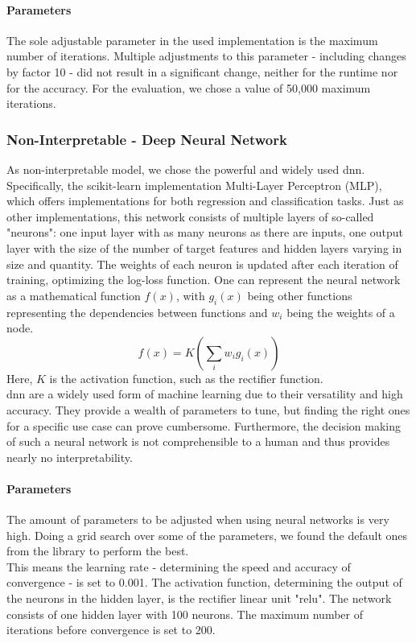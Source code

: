 \documentclass[conference,comsoc]{IEEEtran}
\begin{document}
\paragraph{Parameters}
The sole adjustable parameter in the used implementation is the maximum number of iterations. 
Multiple adjustments to this parameter - including changes by factor 10 - did not result in a significant change, neither for the runtime nor for the accuracy. 
For the evaluation, we chose a value of 50,000 maximum iterations.

\subsubsection{Non-Interpretable - Deep Neural Network}
As non-interpretable model, we chose the powerful and widely used \gls{dnn}. 
Specifically, the scikit-learn implementation Multi-Layer Perceptron (MLP), which offers implementations for both regression and classification tasks.
Just as other implementations, this network consists of multiple layers of so-called "neurons": one input layer with as many neurons as there are inputs, one output layer with the size of the number of target features and hidden layers varying in size and quantity. 
The weights of each neuron is updated after each iteration of training, optimizing the log-loss function. 
One can represent the neural network as a mathematical function $f(x)$, with $g_i (x)$ being other functions representing the dependencies between functions and $w_i$ being the weights of a node. 
\begin{equation}
f(x) = K(\sum _i w_i g_i (x))
\end{equation}
Here, $K$ is the activation function, such as the rectifier function. \\
\gls{dnn} are a widely used form of machine learning due to their versatility and high accuracy.
They provide a wealth of parameters to tune, but finding the right ones for a specific use case can prove cumbersome.
Furthermore, the decision making of such a neural network is not comprehensible to a human and thus provides nearly no interpretability.
\paragraph{Parameters}
The amount of parameters to be adjusted when using neural networks is very high.
Doing a grid search over some of the parameters, we found the default ones from the library to perform the best.\\
This means the learning rate - determining the speed and accuracy of convergence - is set to 0.001. 
The activation function, determining the output of the neurons in the hidden layer, is the rectifier linear unit "relu". 
The network consists of one hidden layer with 100 neurons. 
The maximum number of iterations before convergence is set to 200.
\end{document}
